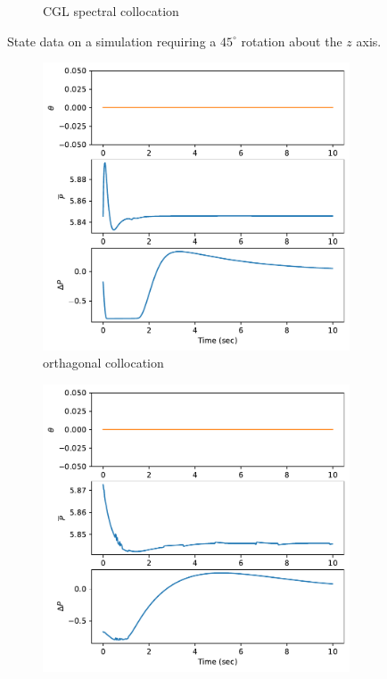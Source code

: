 \documentclass[]{article}
\begin{document}
\begin{figure}[H]
\begin{subfigure}[b]{0.3\textwidth}
		\caption{CGL spectral collocation}
	\end{subfigure}
	\caption{State data on a simulation requiring a $45^{\circ}$ rotation about the $z$ axis.}
	\label{fig:state45z}
\end{figure}

\begin{figure}[H]
	\centering
	\begin{subfigure}[b]{0.3\textwidth}
		\centering
		\includegraphics[width=\textwidth]{control45dz4.pdf}
		\caption{orthagonal collocation}
	\end{subfigure}%
	\begin{subfigure}[b]{0.3\textwidth}
		\centering
		\includegraphics[width=\textwidth]{control45dz5.pdf}

\end{subfigure}
\end{figure}
\end{document}
